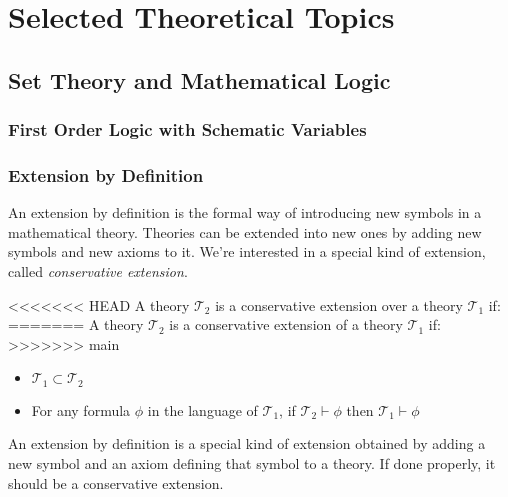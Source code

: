 \part{Selected Theoretical Topics}
\label{part:theory}

\chapter{Set Theory and Mathematical Logic}
\section{First Order Logic with Schematic Variables}
\label{sect:theoryfol}
\section{Extension by Definition}
An extension by definition is the formal way of introducing new symbols in a mathematical theory.
Theories can be extended into new ones by adding new symbols and new axioms to it. We're interested in a special kind of extension, called \textit{conservative extension}.
\begin{defin}
<<<<<<< HEAD
A theory $\mathcal{T}_2$ is a conservative extension over a theory $\mathcal{T}_1$ if:
=======
A theory $\mathcal{T}_2$ is a conservative extension of a theory $\mathcal{T}_1$ if:
>>>>>>> main
\begin{itemize}
	\item $\mathcal{T}_1 \subset \mathcal{T}_2$
	\item For any formula $\phi$ in the language of $\mathcal{T}_1$, if $\mathcal{T}_2 \vdash 		\phi$ then $\mathcal{T}_1 \vdash \phi$
\end{itemize}
\end{defin}

An extension by definition is a special kind of extension obtained by adding a new symbol and an axiom defining that symbol to a theory. If done properly, it should be a conservative extension.

